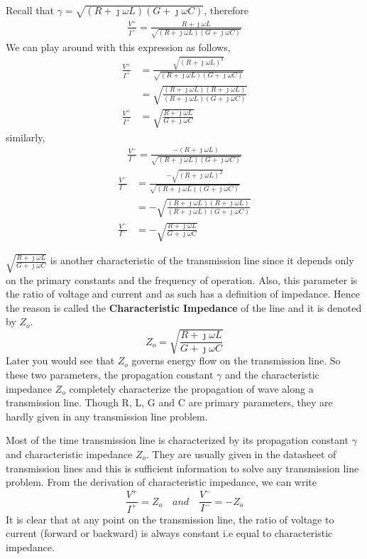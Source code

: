 Recall that $\gamma = \sqrt{(R + \jmath\omega L)(G + \jmath\omega C)}$, therefore
\begin{align*}
\frac{V^+}{I^+} = \frac{R+\jmath\omega L}{\sqrt{(R + \jmath\omega L)(G + \jmath\omega C)}}
\end{align*}
We can play around with this expression as follows,
\begin{align*}
\frac{V^+}{I^+} &= \frac{\sqrt{(R+\jmath\omega L)^2}}{\sqrt{(R + \jmath\omega L)(G + \jmath\omega C)}}\\
&=\sqrt{\frac{(R+\jmath\omega L)(R+\jmath\omega L)}{(R + \jmath\omega L)(G + \jmath\omega C)}}\\
\frac{V^+}{I^+} &=\sqrt{\frac{R+\jmath\omega L}{G+\jmath\omega C}}
\end{align*}
similarly,
\begin{align*}
\frac{V^-}{I^-} = \frac{-(R+\jmath\omega L)}{\sqrt{(R + \jmath\omega L)(G + \jmath\omega C)}}
\end{align*}
\begin{align*}
\frac{V^-}{I^-} &= \frac{-\sqrt{(R+\jmath\omega L)^2}}{\sqrt{(R + \jmath\omega L)(G + \jmath\omega C)}}\\
&=-\sqrt{\frac{(R+\jmath\omega L)(R+\jmath\omega L)}{(R + \jmath\omega L)(G + \jmath\omega C)}}\\
\frac{V^-}{I^-} &=-\sqrt{\frac{R+\jmath\omega L}{G+\jmath\omega C}}
\end{align*}

$\sqrt{\frac{R+\jmath\omega L}{G+\jmath\omega C}}$ is another characteristic of the transmission line since it depends only on the primary constants and the frequency of operation. Also, this parameter is the ratio of voltage and current and as such has a definition of impedance. Hence the reason is called the \textbf{Characteristic Impedance} of the line and it is denoted by $Z_o$.
\begin{equation}
Z_o = \sqrt{\frac{R+\jmath\omega L}{G+\jmath\omega C}}
\end{equation}
Later you would see that $Z_o$ governs energy flow on the transmission line. So these two parameters, the propagation constant $\gamma$ and the characteristic impedance $Z_o$ completely characterize the propagation of wave along a transmission line. Though R, L, G and C are primary parameters, they are hardly given in any transmission line problem. 

Most of the time transmission line is characterized by its propagation constant $\gamma$ and characteristic impedance $Z_o$. They are usually given in the datasheet of transmission lines and this is sufficient information to solve any transmission line problem.
From the derivation of characteristic impedance, we can write
\begin{equation}
\frac{V^+}{I^+} = Z_o\quad and\quad \frac{V^-}{I^-} = -Z_o
\end{equation}
It is clear that at any point on the transmission line, the ratio of voltage to current (forward or backward) is always constant i.e equal to characteristic impedance.\\

